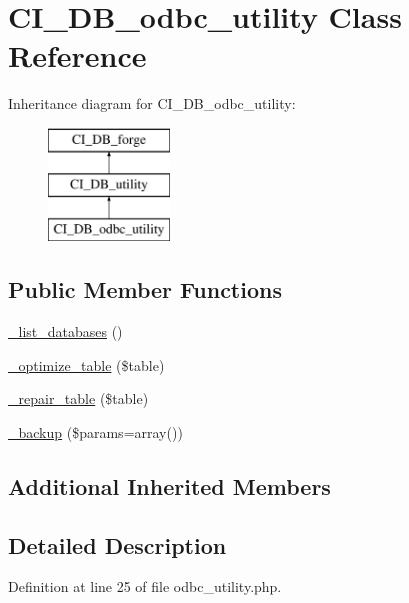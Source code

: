 \hypertarget{class_c_i___d_b__odbc__utility}{\section{C\-I\-\_\-\-D\-B\-\_\-odbc\-\_\-utility Class Reference}
\label{class_c_i___d_b__odbc__utility}
}
Inheritance diagram for C\-I\-\_\-\-D\-B\-\_\-odbc\-\_\-utility\-:\begin{figure}[H]
\begin{center}
\leavevmode
\includegraphics[height=3.000000cm]{class_c_i___d_b__odbc__utility}
\end{center}
\end{figure}
\subsection*{Public Member Functions}
\begin{DoxyCompactItemize}
\item 
\hyperlink{class_c_i___d_b__odbc__utility_aa047e69a7e732ca7280270f87f82bb3a}{\-\_\-list\-\_\-databases} ()
\item 
\hyperlink{class_c_i___d_b__odbc__utility_a4856292816fbbc8e9d927f565766727b}{\-\_\-optimize\-\_\-table} (\$table)
\item 
\hyperlink{class_c_i___d_b__odbc__utility_a7f40d4a3d78917e455e315cf708842ef}{\-\_\-repair\-\_\-table} (\$table)
\item 
\hyperlink{class_c_i___d_b__odbc__utility_a30f3053d2c82e7562349924363507afa}{\-\_\-backup} (\$params=array())
\end{DoxyCompactItemize}
\subsection*{Additional Inherited Members}


\subsection{Detailed Description}


Definition at line 25 of file odbc\-\_\-utility.\-php.



